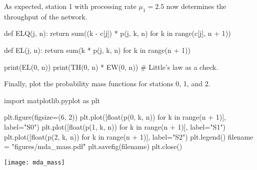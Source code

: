 \begin{exercise}
\begin{solution}
As expected, station 1 with processing rate $\mu_1=2.5$ now determines
the throughput of the network.


\begin{pyconsole}
def ELQ(j, n):
    return sum((k - c[j]) * p(j, k, n) for k in range(c[j], n + 1))


def EL(j, n):
    return sum(k * p(j, k, n) for k in range(n + 1))

print(EL(0, n))
print(TH(0, n) * EW(0, n)) # Little's law as a check.
  
\end{pyconsole}

Finally, plot the probability mass functions for stations 0, 1, and 2.

  
\begin{pyconsole}
import matplotlib.pyplot as plt

plt.figure(figsize=(6, 2))
plt.plot([float(p(0, k, n)) for k in range(n + 1)], label="S0")
plt.plot([float(p(1, k, n)) for k in range(n + 1)], label="S1")
plt.plot([float(p(2, k, n)) for k in range(n + 1)], label="S2")
plt.legend()
filename = "figures/mda_mass.pdf"
plt.savefig(filename)
plt.close()
  
\end{pyconsole}

\texttt{[image: mda\_mass]}

\end{solution}
\end{exercise}






